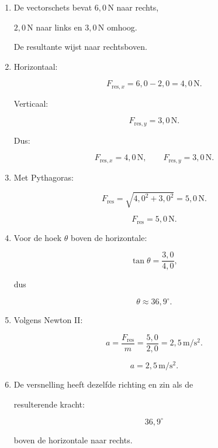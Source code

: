 \documentclass{ximera}
\begin{document}
\begin{oefening}{\oefU\ESS}
\begin{oplossing}
\begin{enumerate}

  \item De vectorschets bevat $6{,}0\,\mathrm N$ naar rechts,

  $2{,}0\,\mathrm N$ naar links en $3{,}0\,\mathrm N$ omhoog.

  De resultante wijst naar rechtsboven.

  \item Horizontaal:

  \[F_{\mathrm{res},x}=6{,}0-2{,}0=4{,}0\,\mathrm N.\]

  Verticaal:

  \[F_{\mathrm{res},y}=3{,}0\,\mathrm N.\]

  Dus:

  \[\boxed{ F_{\mathrm{res},x}=4{,}0\,\mathrm N, \qquad F_{\mathrm{res},y}=3{,}0\,\mathrm N }.\]

  \item Met Pythagoras:

  \[F_{\mathrm{res}} = \sqrt{4{,}0^2+3{,}0^2} = 5{,}0\,\mathrm N.\]

  \[\boxed{F_{\mathrm{res}}=5{,}0\,\mathrm N}.\]

  \item Voor de hoek $\theta$ boven de horizontale:

  \[\tan\theta=\frac{3{,}0}{4{,}0},\]

  dus

  \[\theta\approx36{,}9^\circ.\]

  \item Volgens Newton II:

  \[a=\frac{F_{\mathrm{res}}}{m} =\frac{5{,}0}{2{,}0} =2{,}5\,\mathrm{m/s^2}.\]

  \[\boxed{a=2{,}5\,\mathrm{m/s^2}}.\]

  \item De versnelling heeft dezelfde richting en zin als de

  resulterende kracht:

  \[\boxed{36{,}9^\circ}\]

  boven de horizontale naar rechts.

\end{enumerate}

\end{oplossing}

\end{oefening}


\end{document}
